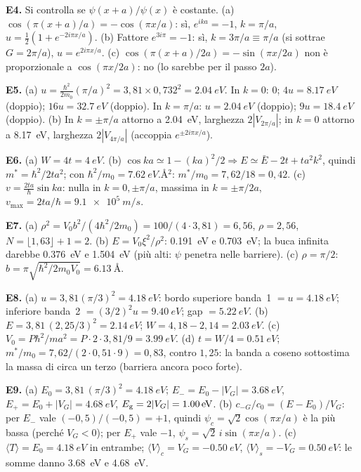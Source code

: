 \documentclass[11pt,a4paper]{article}
\begin{document}
\smallskip\noindent\textbf{E4.} Si controlla se $\psi(x+a)/\psi(x)$ è costante. (a) $\cos(\pi(x+a)/a)=-\cos(\pi x/a)$: sì, $e^{ika}=-1$, $k=\pi/a$, $u=\frac12(1+e^{-2i\pi x/a})$. (b) Fattore $e^{3i\pi}=-1$: sì, $k=3\pi/a\equiv\pi/a$ (si sottrae $G=2\pi/a$), $u=e^{2i\pi x/a}$. (c) $\cos(\pi(x+a)/2a)=-\sin(\pi x/2a)$ non è proporzionale a $\cos(\pi x/2a)$: no (lo sarebbe per il passo $2a$).

\smallskip\noindent\textbf{E5.} (a) $u=\frac{\hbar^2}{2m_0}(\pi/a)^2=3{,}81\times0{,}732^2=\SI{2.04}{eV}$. In $k=0$: $0$; $4u=\SI{8.17}{eV}$ (doppio); $16u=\SI{32.7}{eV}$ (doppio). In $k=\pi/a$: $u=\SI{2.04}{eV}$ (doppio); $9u=\SI{18.4}{eV}$ (doppio). (b) In $k=\pm\pi/a$ attorno a \SI{2.04}{eV}, larghezza $2|V_{2\pi/a}|$; in $k=0$ attorno a \SI{8.17}{eV}, larghezza $2|V_{4\pi/a}|$ (accoppia $e^{\pm2i\pi x/a}$).

\smallskip\noindent\textbf{E6.} (a) $W=4t=\SI{4}{eV}$. (b) $\cos ka\simeq1-(ka)^2/2\Rightarrow E\simeq\bar E-2t+ta^2k^2$, quindi $m^*=\hbar^2/2ta^2$; con $\hbar^2/m_0=\SI{7.62}{eV.\angstrom^2}$: $m^*/m_0=7{,}62/18=0{,}42$. (c) $v=\frac{2ta}\hbar\sin ka$: nulla in $k=0,\pm\pi/a$, massima in $k=\pm\pi/2a$, $v_{\max}=2ta/\hbar=\SI{9.1e5}{m/s}$.

\smallskip\noindent\textbf{E7.} (a) $\rho^2=V_0b^2/(4\hbar^2/2m_0)=100/(4\cdot3{,}81)=6{,}56$, $\rho=2{,}56$, $N=\lfloor1{,}63\rfloor+1=2$. (b) $E=V_0\xi^2/\rho^2$: \SI{0.191}{eV} e \SI{0.703}{eV}; la buca infinita darebbe \SI{0.376}{eV} e \SI{1.504}{eV} (più alti: $\psi$ penetra nelle barriere). (c) $\rho=\pi/2$: $b=\pi\sqrt{\hbar^2/2m_0V_0}=\SI{6.13}{\angstrom}$.

\smallskip\noindent\textbf{E8.} (a) $u=3{,}81(\pi/3)^2=\SI{4.18}{eV}$: bordo superiore banda~1 $=u=\SI{4.18}{eV}$; inferiore banda~2 $=(3/2)^2u=\SI{9.40}{eV}$; gap $=\SI{5.22}{eV}$. (b) $E=3{,}81\,(2{,}25/3)^2=\SI{2.14}{eV}$; $W=4{,}18-2{,}14=\SI{2.03}{eV}$. (c) $V_0=P\hbar^2/ma^2=P\cdot2\cdot3{,}81/9=\SI{3.99}{eV}$. (d) $t=W/4=\SI{0.51}{eV}$; $m^*/m_0=7{,}62/(2\cdot0{,}51\cdot9)=0{,}83$, contro $1{,}25$: la banda a coseno sottostima la massa di circa un terzo (barriera ancora poco forte).

\smallskip\noindent\textbf{E9.} (a) $E_0=3{,}81\,(\pi/3)^2=\SI{4.18}{eV}$; $E_-=E_0-|V_G|=\SI{3.68}{eV}$, $E_+=E_0+|V_G|=\SI{4.68}{eV}$, $E_{\mathrm g}=2|V_G|=\SI{1.00}{eV}$. (b) $c_{-G}/c_0=(E-E_0)/V_G$: per $E_-$ vale $(-0{,}5)/(-0{,}5)=+1$, quindi $\psi_c=\sqrt2\cos(\pi x/a)$ è la più bassa (perché $V_G<0$); per $E_+$ vale $-1$, $\psi_s=\sqrt2\,i\sin(\pi x/a)$. (c) $\langle T\rangle=E_0=\SI{4.18}{eV}$ in entrambe; $\langle V\rangle_c=V_G=\SI{-0.50}{eV}$, $\langle V\rangle_s=-V_G=\SI{+0.50}{eV}$: le somme danno \SI{3.68}{eV} e \SI{4.68}{eV}.
\end{document}
